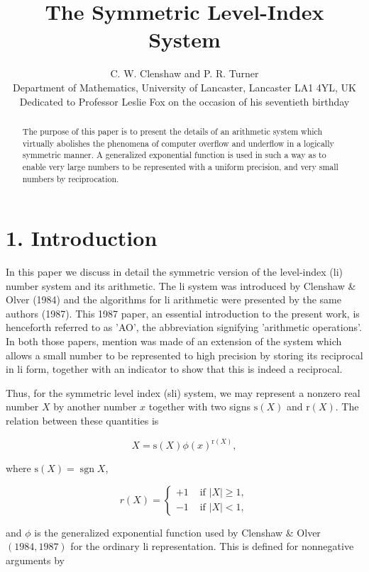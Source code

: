 \documentclass[10pt]{article}
\title{The Symmetric Level-Index System }
\author{C. W. Clenshaw and P. R. Turner\\
Department of Mathematics, University of Lancaster, Lancaster LA1 4YL, UK\\
Dedicated to Professor Leslie Fox on the occasion of his seventieth birthday}
\date{}
\begin{document}

\begin{abstract}
The purpose of this paper is to present the details of an arithmetic system which virtually abolishes the phenomena of computer overflow and underflow in a logically symmetric manner. A generalized exponential function is used in such a way as to enable very large numbers to be represented with a uniform precision, and very small numbers by reciprocation.
\end{abstract}

\section*{1. Introduction}
In this paper we discuss in detail the symmetric version of the level-index (li) number system and its arithmetic. The li system was introduced by Clenshaw \& Olver (1984) and the algorithms for li arithmetic were presented by the same authors (1987). This 1987 paper, an essential introduction to the present work, is henceforth referred to as 'AO', the abbreviation signifying 'arithmetic operations'. In both those papers, mention was made of an extension of the system which allows a small number to be represented to high precision by storing its reciprocal in li form, together with an indicator to show that this is indeed a reciprocal.

Thus, for the symmetric level index (sli) system, we may represent a nonzero real number $X$ by another number $x$ together with two signs $\mathrm{s}(X)$ and $\mathrm{r}(X)$. The relation between these quantities is


\begin{equation*}
X=\mathrm{s}(X) \phi(x)^{\mathrm{r}(X)}, \tag{1}
\end{equation*}


where $\mathrm{s}(X)=\operatorname{sgn} X$,

$$
r(X)= \begin{cases}+1 & \text { if }|X| \geqslant 1, \\ -1 & \text { if }|X|<1,\end{cases}
$$

and $\phi$ is the generalized exponential function used by Clenshaw \& Olver $(1984,1987)$ for the ordinary li representation. This is defined for nonnegative arguments by
\end{document}
